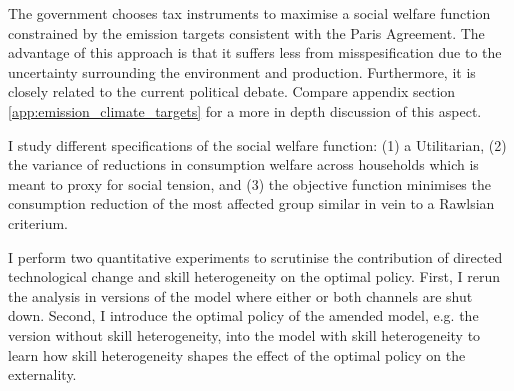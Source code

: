 The government chooses tax instruments to maximise a social welfare function constrained by the  emission targets consistent with the Paris Agreement.  The advantage of this approach is that it suffers less from  misspesification due to the uncertainty surrounding the environment and production. Furthermore, it is closely related to the current political debate. Compare appendix section \ref{app:emission_climate_targets} for a more in depth discussion of this aspect.  

I study different specifications of the social welfare function: (1) a Utilitarian, (2) the variance of reductions in consumption welfare across households which is meant to proxy for social tension, and (3) the objective function minimises the consumption reduction of the most affected group similar in vein to a Rawlsian criterium. 

I perform two quantitative experiments to scrutinise the contribution of directed technological change and skill heterogeneity on the optimal policy. First, I rerun the analysis in versions of the model where either or both channels are shut down.  Second, I introduce the optimal policy of the amended model, e.g. the  version without skill heterogeneity, into the model with skill heterogeneity to learn how skill heterogeneity shapes the effect of the optimal policy on the externality.

